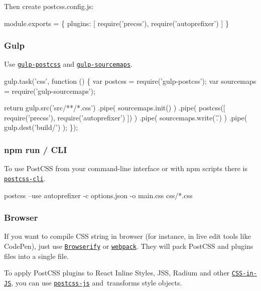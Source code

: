 Then create {\ttfamily postcss.\+config.\+js}\+:


\begin{DoxyCode}
module.exports = \{
    plugins: [
        require('precss'),
        require('autoprefixer')
    ]
\}
\end{DoxyCode}


\subsubsection*{Gulp}

Use \href{https://github.com/postcss/gulp-postcss}{\tt {\ttfamily gulp-\/postcss}} and \href{https://github.com/floridoo/gulp-sourcemaps}{\tt {\ttfamily gulp-\/sourcemaps}}.


\begin{DoxyCode}
gulp.task('css', function () \{
    var postcss    = require('gulp-postcss');
    var sourcemaps = require('gulp-sourcemaps');

    return gulp.src('src/**/*.css')
        .pipe( sourcemaps.init() )
        .pipe( postcss([ require('precss'), require('autoprefixer') ]) )
        .pipe( sourcemaps.write('.') )
        .pipe( gulp.dest('build/') );
\});
\end{DoxyCode}


\subsubsection*{npm run / C\+LI}

To use Post\+C\+SS from your command-\/line interface or with npm scripts there is \href{https://github.com/postcss/postcss-cli}{\tt {\ttfamily postcss-\/cli}}.


\begin{DoxyCode}
postcss --use autoprefixer -c options.json -o main.css css/*.css
\end{DoxyCode}


\subsubsection*{Browser}

If you want to compile C\+SS string in browser (for instance, in live edit tools like Code\+Pen), just use \href{http://browserify.org/}{\tt Browserify} or \href{https://webpack.github.io/}{\tt webpack}. They will pack Post\+C\+SS and plugins files into a single file.

To apply Post\+C\+SS plugins to React Inline Styles, J\+SS, Radium and other \href{https://github.com/MicheleBertoli/css-in-js}{\tt C\+S\+S-\/in-\/\+JS}, you can use \href{https://github.com/postcss/postcss-js}{\tt {\ttfamily postcss-\/js}} and transforms style objects.


